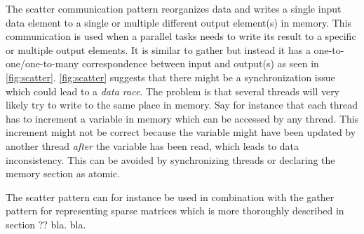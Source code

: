 The scatter communication pattern reorganizes data and writes a single input data element to a single or multiple different output element(s) in memory.
This communication is used when a parallel tasks needs to write its result to a specific or multiple output elements.
It is similar to gather but instead it has a one-to-one/one-to-many correspondence between input and output(s) as seen in \autoref{fig:scatter}.
\autoref{fig:scatter} suggests that there might be a synchronization issue which could lead to a \textit{data race}.
The problem is that several threads will very likely try to write to the same place in memory.
Say for instance that each thread has to increment a variable in memory which can be accessed by any thread.
This increment might not be correct because the variable might have been updated by another thread \textit{after} the variable has been read, which leads to data inconsistency.
This can be avoided by synchronizing threads or declaring the memory section as atomic.

The scatter pattern can for instance be used in combination with the gather pattern for representing sparse matrices which is more thoroughly described in section ?? bla. bla.